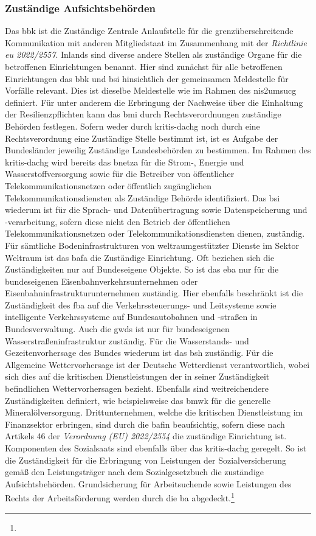 \documentclass[11pt,a4paper,hidelinks]{article}   %
\begin{document}
            \subsubsection{Zuständige Aufsichtsbehörden}
                Das \gls{bbk} ist die Zuständige Zentrale Anlaufstelle für die grenzüberschreitende Kommunikation mit anderen Mitgliedstaat im Zusammenhang mit der \emph{Richtlinie \gls{eu} 2022/2557}. Inlands sind diverse andere Stellen als zuständige Organe für die betroffenen Einrichtungen benannt. Hier sind zunächst für alle betroffenen Einrichtungen das \gls{bbk} und \gls{bsi} hinsichtlich der gemeinsamen Meldestelle für Vorfälle relevant. Dies ist dieselbe Meldestelle wie im Rahmen des \gls{nis2umsucg} definiert. Für unter anderem die Erbringung der Nachweise über die Einhaltung der Resilienzpflichten kann das \gls{bmi} durch Rechtsverordnungen zuständige Behörden festlegen. Sofern weder durch \gls{kritis-dachg} noch durch eine Rechtsverordnung eine Zuständige Stelle bestimmt ist, ist es Aufgabe der Bundesländer jeweilig Zuständige Landesbehörden zu bestimmen. Im Rahmen des \gls{kritis-dachg} wird bereits das \gls{bnetza} für die Strom-, Energie und Wasserstoffversorgung sowie für die Betreiber von öffentlicher Telekommunikationsnetzen oder öffentlich zugänglichen Telekommunikationsdiensten als Zuständige Behörde identifiziert. Das \gls{bsi} wiederum ist für die Sprach- und Datenübertragung sowie Datenspeicherung und -verarbeitung, sofern diese nicht den Betrieb der öffentlichen Telekommunikationsnetzen oder Telekommunikationsdiensten dienen, zuständig. Für sämtliche Bodeninfrastrukturen von weltraumgestützter Dienste im Sektor Weltraum ist das \gls{bafa} die Zuständige Einrichtung. Oft beziehen sich die Zuständigkeiten nur auf Bundeseigene Objekte. So ist das \gls{eba} nur für die bundeseigenen Eisenbahnverkehrsunternehmen oder Eisenbahninfrastrukturunternehmen zuständig. Hier ebenfalls beschränkt ist die Zuständigkeit des \gls{fba} auf die Verkehrssteuerungs- und Leitsysteme sowie intelligente Verkehrssysteme auf Bundesautobahnen und -straßen in Bundesverwaltung. Auch die \gls{gwds} ist nur für bundeseigenen Wasserstraßeninfrastruktur zuständig. Für die Wasserstands- und Gezeitenvorhersage des Bundes wiederum ist das \gls{bsh} zuständig. Für die Allgemeine Wettervorhersage ist der Deutsche Wetterdienst verantwortlich, wobei sich dies auf die kritischen Dienstleistungen der in seiner Zuständigkeit befindlichen Wettervorhersagen bezieht. Ebenfalls sind weitreichendere Zuständigkeiten definiert, wie beispielsweise das \gls{bmwk} für die generelle Mineralölversorgung. Drittunternehmen, welche die kritischen Dienstleistung im Finanzsektor erbringen, sind durch die \gls{bafin} beaufsichtig, sofern diese nach Artikels 46 der \emph{Verordnung (EU) 2022/2554} die zuständige Einrichtung ist. Komponenten des Sozialsaats sind ebenfalls über das \gls{kritis-dachg} geregelt. So ist die Zuständigkeit für die Erbringung von Leistungen der Sozialversicherung gemäß den Leistungsträger nach dem Sozialgesetzbuch die zuständige Aufsichtsbehörden. Grundsicherung für Arbeitsuchende sowie Leistungen des Rechts der Arbeitsförderung werden durch die \gls{ba} abgedeckt.\footnote{
}
\end{document}
